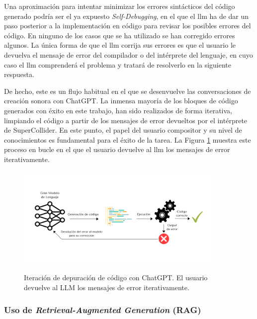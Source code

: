 Una aproximación para intentar minimizar los errores sintácticos del código generado podría ser el ya expuesto \textit{Self-Debugging}, en el que el \gls{llm} ha de dar un paso posterior a la implementación en código para revisar los posibles errores del código. En ninguno de los casos que se ha utilizado se han corregido errores algunos. La única forma de que el \gls{llm} corrija sus errores es que el usuario le devuelva el mensaje de error del compilador o del intérprete del lenguaje, en cuyo caso el \gls{llm} comprenderá el problema y tratará de resolverlo en la siguiente respuesta. 

De hecho, este es un flujo habitual en el que se desenvuelve las conversaciones de creación sonora con ChatGPT. La inmensa mayoría de los bloques de código generados con éxito en este trabajo, han sido realizados de forma iterativa, limpiando el código a partir de los mensajes de error devueltos por el intérprete de SuperCollider. En este punto, el papel del usuario compositor y su nivel de conocimientos es fundamental para el éxito de la tarea. La Figura \ref{fig:iteracion_depuracion} muestra este proceso en bucle en el que el usuario devuelve al \gls{llm} los mensajes de error iterativamente.

\begin{figure}[H]
    \caption[Iteración de depuración de código con ChatGPT]{Iteración de depuración de código con ChatGPT. El usuario devuelve al LLM los mensajes de error iterativamente.}
    \centering
    \includegraphics[width=0.9\textwidth]{./figuras/iteracion_depuracion_codigo.png}
    \source{\propio}
    \label{fig:iteracion_depuracion}
\end{figure}

\subsubsection{Uso de \textit{Retrieval-Augmented Generation} (RAG)}


